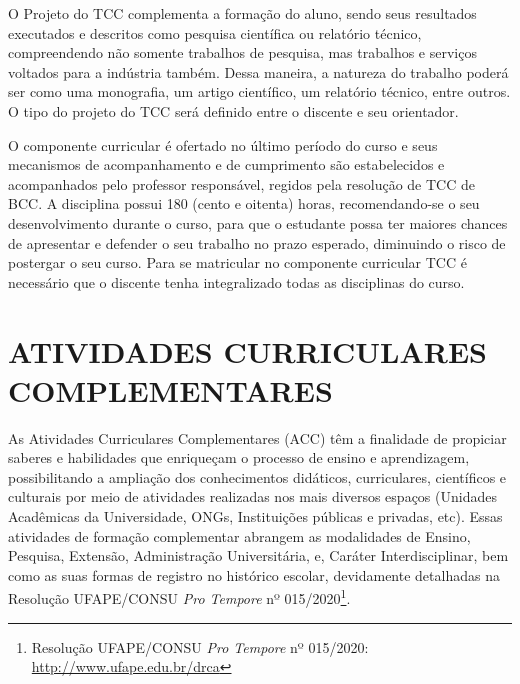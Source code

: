 \documentclass[
	12pt,				%
	openright,			%
  oneside,     %
	a4paper,			%
	chapter=TITLE,		%
	english,			%
	french,				%
	spanish,			%
	brazil				%
	]{abntex2}
\begin{document}
O Projeto do TCC complementa a formação do aluno, sendo seus resultados executados e descritos como pesquisa científica ou relatório técnico, compreendendo não somente trabalhos de pesquisa, mas trabalhos e serviços voltados para a indústria também.  Dessa maneira, a natureza do trabalho poderá ser como uma monografia, um artigo científico, um relatório técnico, entre outros. O tipo do projeto do TCC será definido entre o discente e seu orientador.

O componente curricular é ofertado no último período do curso e seus mecanismos de acompanhamento e de cumprimento são estabelecidos e acompanhados pelo professor responsável, regidos pela resolução de TCC de BCC. A disciplina possui 180 (cento e oitenta) horas, recomendando-se o seu desenvolvimento durante o curso, para que o estudante possa ter maiores chances de apresentar e defender o seu trabalho no prazo esperado, diminuindo o risco de postergar o seu curso. Para se matricular no componente curricular TCC é necessário que o discente tenha integralizado todas as disciplinas do curso.






%
%




\chapter{ATIVIDADES CURRICULARES COMPLEMENTARES}

As Atividades Curriculares Complementares (ACC) têm a finalidade de propiciar saberes e habilidades que enriqueçam o processo de ensino e aprendizagem, possibilitando a ampliação dos conhecimentos didáticos, curriculares, científicos e culturais por meio de atividades realizadas nos mais diversos espaços (Unidades Acadêmicas da Universidade, ONGs, Instituições públicas e privadas, etc). Essas atividades de formação complementar abrangem as modalidades de Ensino, Pesquisa, Extensão, Administração Universitária, e, Caráter Interdisciplinar, bem como as suas formas de registro no histórico escolar, devidamente detalhadas na Resolução UFAPE/CONSU \textit{Pro Tempore} nº 015/2020\footnote{Resolução UFAPE/CONSU \textit{Pro Tempore} nº 015/2020: \url{http://www.ufape.edu.br/drca}}. 
\end{document}
